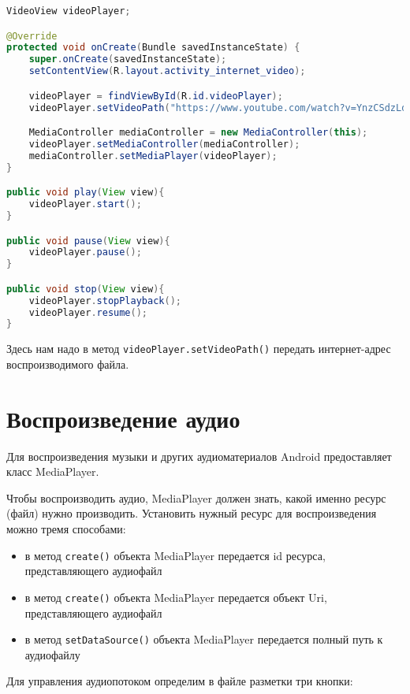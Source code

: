 \begin{lstlisting}[language=Java
	, label=lst:
	]
VideoView videoPlayer;

@Override
protected void onCreate(Bundle savedInstanceState) {
	super.onCreate(savedInstanceState);
	setContentView(R.layout.activity_internet_video);

	videoPlayer = findViewById(R.id.videoPlayer);
	videoPlayer.setVideoPath("https://www.youtube.com/watch?v=YnzCSdzLdx8");

	MediaController mediaController = new MediaController(this);
	videoPlayer.setMediaController(mediaController);
	mediaController.setMediaPlayer(videoPlayer);
}

public void play(View view){
	videoPlayer.start();
}

public void pause(View view){
	videoPlayer.pause();
}

public void stop(View view){
	videoPlayer.stopPlayback();
	videoPlayer.resume();
}
\end{lstlisting}

Здесь нам надо в метод \texttt{videoPlayer.setVideoPath()} передать
интернет-адрес воспроизводимого файла.

\section{Воспроизведение аудио}
Для воспроизведения музыки и других аудиоматериалов Android
предоставляет класс MediaPlayer.\par
Чтобы воспроизводить аудио, MediaPlayer должен знать, какой именно
ресурс (файл) нужно производить. Установить нужный ресурс для
воспроизведения можно тремя способами:

\begin{itemize}
	\item в метод \texttt{create()} объекта MediaPlayer передается id ресурса,
		представляющего аудиофайл
	\item в метод \texttt{create()} объекта MediaPlayer передается объект Uri,
		представляющего аудиофайл
	\item в метод \texttt{setDataSource()} объекта MediaPlayer передается
		полный путь к аудиофайлу
\end{itemize}

Для управления аудиопотоком определим в файле разметки три
кнопки:

